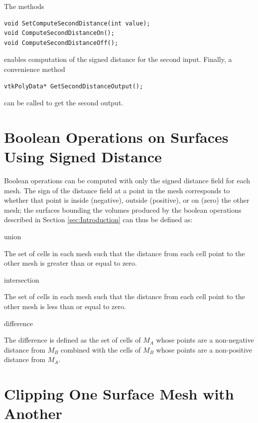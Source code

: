 \documentclass{InsightArticle}
\begin{document}
The methods
\begin{verbatim}
void SetComputeSecondDistance(int value);
void ComputeSecondDistanceOn();
void ComputeSecondDistanceOff();
\end{verbatim}
enables computation of the signed distance for the second input. Finally, a convenience method
\begin{verbatim}
vtkPolyData* GetSecondDistanceOutput();
\end{verbatim}
can be called to get the second output.

\section{Boolean Operations on Surfaces Using Signed Distance}

Boolean operations can be computed with only the signed distance field for each mesh. The sign of the distance field at a point in the mesh corresponds to whether that point is inside (negative), outside (positive), or on (zero) the other mesh; the surfaces bounding the volumes produced by the boolean operations described in Section \ref{sec:Introduction} can thus be defined as:

\begin{description}

\item union

The set of cells in each mesh such that the distance from each cell point to the other mesh is greater than or equal to zero.

\item intersection

The set of cells in each mesh such that the distance from each cell point to the other mesh is less than or equal to zero.

\item difference

The difference is defined as the set of cells of $M_A$ whose points are a non-negative distance from $M_B$ combined with the cells of $M_B$ whose points are a non-positive distance from $M_A$.

\end{description}

\section{Clipping One Surface Mesh with Another}
\end{document}
